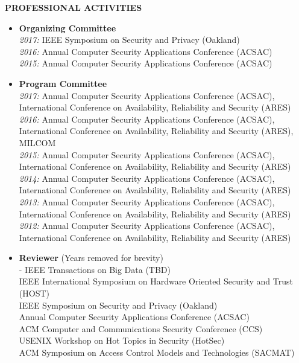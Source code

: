 \documentclass[10pt]{article}
\begin{document}
\vspace{1em} {\Large \textbf{PROFESSIONAL ACTIVITIES}}
\begin{itemize}
  \item \textbf{Organizing Committee}\\
    \textit{2017:} IEEE Symposium on Security and Privacy (Oakland)\\
    \textit{2016:} Annual Computer Security Applications Conference (ACSAC)\\
    \textit{2015:} Annual Computer Security Applications Conference (ACSAC)
  \item \textbf{Program Committee}\\
    \textit{2017:} Annual Computer Security Applications Conference (ACSAC), International Conference on Availability, Reliability and Security (ARES)\\
    \textit{2016:} Annual Computer Security Applications Conference (ACSAC), International Conference on Availability, Reliability and Security (ARES), MILCOM\\
    \textit{2015:} Annual Computer Security Applications Conference (ACSAC), International Conference on Availability, Reliability and Security (ARES)\\
    \textit{2014:} Annual Computer Security Applications Conference (ACSAC), International Conference on Availability, Reliability and Security (ARES)\\
    \textit{2013:} Annual Computer Security Applications Conference (ACSAC), International Conference on Availability, Reliability and Security (ARES)\\
    \textit{2012:} Annual Computer Security Applications Conference (ACSAC), International Conference on Availability, Reliability and Security (ARES)\\
  \item \textbf{Reviewer} (Years removed for brevity)\\
    - IEEE Transactions on Big Data (TBD)\\
    IEEE International Symposium on Hardware Oriented Security and Trust (HOST)\\
    IEEE Symposium on Security and Privacy (Oakland)\\
    Annual Computer Security Applications Conference (ACSAC)\\
    ACM Computer and Communications Security Conference (CCS)\\
    USENIX Workshop on Hot Topics in Security (HotSec)\\
    ACM Symposium on Access Control Models and Technologies (SACMAT)\\

\end{itemize}
\end{document}

